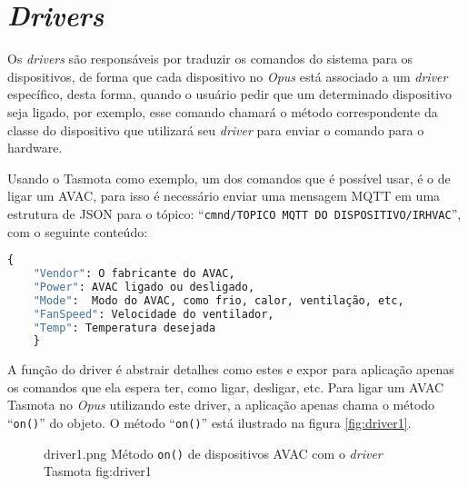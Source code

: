 \section{\emph{Drivers}}

Os \emph{drivers} são responsáveis por traduzir os comandos do sistema para os dispositivos, de forma que cada dispositivo no \emph{Opus} está
associado a um \emph{driver} específico, desta forma, quando o usuário pedir que um determinado dispositivo seja ligado, por exemplo,
esse comando chamará o método correspondente da classe do dispositivo que utilizará seu \emph{driver} para enviar o comando para o hardware.

Usando o Tasmota como exemplo, um dos comandos que é possível usar, é o de ligar um AVAC, para isso é necessário enviar uma mensagem
MQTT em uma estrutura de JSON para o tópico: ``\lstinline{cmnd/TOPICO MQTT DO DISPOSITIVO/IRHVAC}'', com o seguinte conteúdo:
\begin{lstlisting}[language=Python]
    {
    "Vendor": O fabricante do AVAC,
    "Power": AVAC ligado ou desligado,
    "Mode":  Modo do AVAC, como frio, calor, ventilação, etc,
    "FanSpeed": Velocidade do ventilador,
    "Temp": Temperatura desejada
    }
\end{lstlisting}

A função do driver é abstrair detalhes como estes e expor para aplicação apenas os comandos que ela espera ter, como ligar, desligar, etc.
Para ligar um AVAC Tasmota no \emph{Opus} utilizando este driver, a aplicação apenas chama o método ``\lstinline{on()}'' do objeto. O
método ``\lstinline{on()}'' está ilustrado na figura \ref{fig:driver1}.
\begin{figure}[h!]
    {driver1.png}
    {Método \lstinline{on()} de dispositivos AVAC com o \emph{driver} Tasmota}
    {fig:driver1}
\end{figure}

